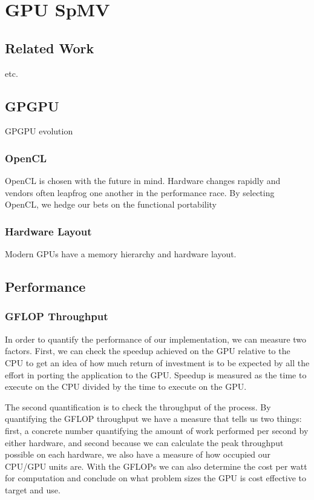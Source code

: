 \documentclass{report}
\begin{document}
\fi


\chapter{GPU SpMV}
\label{chap:gpu_rbffd}

\section{Related Work}
\cite{Bell2009} \cite{Kreuzer2012}
\cite{Vuduc2005} etc. 

\section{GPGPU}
GPGPU evolution
\subsection{OpenCL}
OpenCL is chosen with the future in mind. Hardware changes rapidly and vendors often leapfrog one another in the performance race. By selecting OpenCL, we hedge our bets on the functional portability

\subsection{Hardware Layout}
Modern GPUs have a memory hierarchy and hardware layout. 

\section{Performance}
\subsection{GFLOP Throughput}
In order to quantify the performance of our implementation, we can measure two
factors. First, we can check the speedup achieved on the GPU relative to the
CPU to get an idea of how much return of investment is to be expected by all
the effort in porting the application to the GPU. Speedup is measured as the
time to execute on the CPU divided by the time to execute on the GPU. 

The second quantification is to check the throughput of the process. By
quantifying the GFLOP throughput we have a measure that tells us two things:
first, a concrete number quantifying the amount of work performed per second by
either hardware, and second because we can calculate the peak throughput possible on
each hardware, we also have a measure of how occupied our CPU/GPU units are.
With the GFLOPs we can also determine the cost per watt for computation and
conclude on what problem sizes the GPU is cost effective to target and use. 
\end{document}

